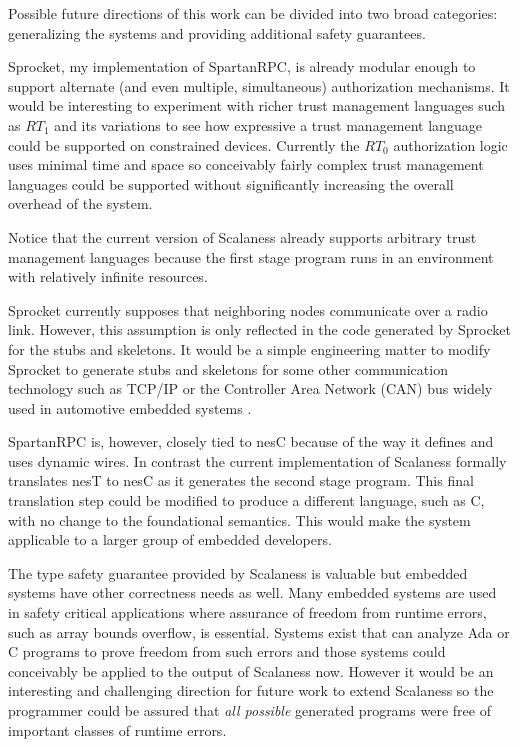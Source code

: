 Possible future directions of this work can be divided into two broad categories: generalizing
the systems and providing additional safety guarantees.

Sprocket, my implementation of SpartanRPC, is already modular enough to support alternate (and
even multiple, simultaneous) authorization mechanisms. It would be interesting to experiment
with richer trust management languages such as $RT_1$ and its variations to see how expressive a
trust management language could be supported on constrained devices. Currently the $RT_0$
authorization logic uses minimal time and space so conceivably fairly complex trust management
languages could be supported without significantly increasing the overall overhead of the
system.

Notice that the current version of Scalaness already supports arbitrary trust management
languages because the first stage program runs in an environment with relatively infinite
resources.

Sprocket currently supposes that neighboring nodes communicate over a radio link. However, this
assumption is only reflected in the code generated by Sprocket for the stubs and skeletons. It
would be a simple engineering matter to modify Sprocket to generate stubs and skeletons for some
other communication technology such as TCP/IP or the Controller Area Network (CAN) bus widely
used in automotive embedded systems \cite{pazul1999controller}.

SpartanRPC is, however, closely tied to nesC because of the way it defines and uses dynamic
wires. In contrast the current implementation of Scalaness formally translates nesT to nesC as
it generates the second stage program. This final translation step could be modified to produce
a different language, such as C, with no change to the foundational semantics. This would make
the system applicable to a larger group of embedded developers.

The type safety guarantee provided by Scalaness is valuable but embedded systems have other
correctness needs as well. Many embedded systems are used in safety critical applications where
assurance of freedom from runtime errors, such as array bounds overflow, is essential. Systems
exist that can analyze Ada or C programs to prove freedom from such errors
\cite{Barnes:2000:SWC:369264.369271,Cuoq:2012:FSA:2404232.2404250} and those systems could
conceivably be applied to the output of Scalaness now. However it would be an interesting and
challenging direction for future work to extend Scalaness so the programmer could be assured
that \emph{all possible} generated programs were free of important classes of runtime errors.

